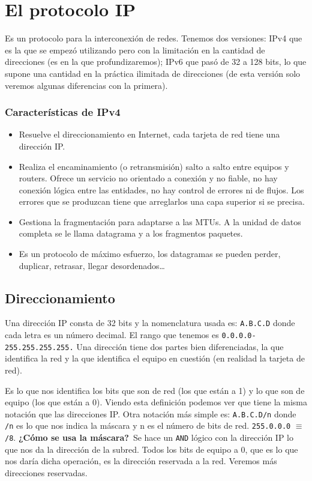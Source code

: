 \section{El protocolo \acrshort{IP}}

Es un protocolo para la interconexión de redes.
Tenemos dos versiones: \acrshort{IPv4} que es la que se empezó utilizando pero con la limitación en la cantidad de direcciones (es en la que profundizaremos); \acrshort{IPv6} que pasó de 32 a 128 bits, lo que supone una cantidad en la práctica ilimitada de direcciones (de esta versión solo veremos algunas diferencias con la primera). 

\subsubsection{Características de \acrshort{IPv4}}
\begin{itemize}
    \item Resuelve el direccionamiento en Internet, cada tarjeta de red tiene una dirección IP\@.
    \item Realiza el encaminamiento (o retransmisión) salto a salto entre equipos y routers. Ofrece un servicio no orientado a conexión y no fiable, no hay conexión lógica entre las entidades, no hay control de errores ni de flujos. Los errores que se produzcan tiene que arreglarlos una capa superior si se precisa. 
    \item Gestiona la fragmentación para adaptarse a las \acrshort{MTU}s. A la unidad de datos completa se le llama datagrama y a los fragmentos paquetes. 
    \item Es un protocolo de máximo esfuerzo, los datagramas se pueden perder, duplicar, retrasar, llegar desordenados\ldots
\end{itemize}

\subsection{Direccionamiento}

Una dirección IP consta de 32 bits y la nomenclatura usada es: \verb|A.B.C.D| donde cada letra es un número decimal. El rango que tenemos es \verb|0.0.0.0-255.255.255.255.| Una dirección tiene dos partes bien diferenciadas, la que identifica la red y la que identifica el equipo en cuestión (en realidad la tarjeta de red). \

\begin{definicion}
    Es lo que nos identifica los bits que son de red (los que están a 1) y lo que son de equipo (los que están a 0). Viendo esta definición podemos ver que tiene la misma notación que las direcciones IP\@. Otra notación más simple es: \verb|A.B.C.D/n| donde \verb|/n| es lo que nos indica la máscara y n es el número de bits de red. \verb|255.0.0.0| $\equiv$ \verb|/8|.
\textbf{¿Cómo se usa la máscara?}\
Se hace un \verb|AND| lógico con la dirección IP lo que nos da la dirección de la subred. Todos los bits de equipo a 0, que es lo que nos daría dicha operación, es la dirección reservada a la red. Veremos más direcciones reservadas. \
\end{definicion}

